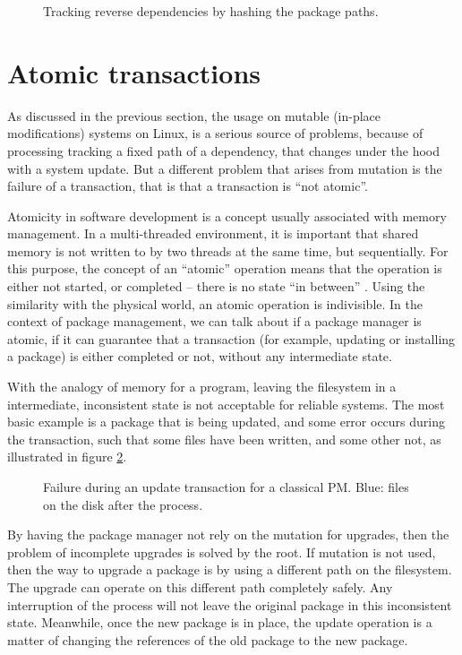 \begin{figure}[hbtp]
    \centerfloat
    
    \caption{Tracking reverse dependencies by hashing the package paths.}
    \label{fig:nginx_miq}
\end{figure}

\FloatBarrier
\section{Atomic transactions}
\label{sec:atomicity}

As discussed in the previous section, the usage on mutable
(in-place modifications) systems on Linux, is a serious
source of problems, because of processing tracking a fixed
path of a dependency, that changes under the hood with a
system update. But a different problem that arises from
mutation is the failure of a transaction, that is that a
transaction is ``not atomic''.

Atomicity in software development is a concept usually
associated with memory management. In a multi-threaded
environment, it is important that shared memory is not
written to by two threads at the same time, but
sequentially. For this purpose, the concept of an ``atomic''
operation means that the operation is either not started, or
completed -- there is no state ``in between''
\cite{neelakantamHardwareAtomicityReliable2007} . Using the
similarity with the physical world, an atomic operation is
indivisible.
In the context of package management, we can talk about if a
package manager is atomic, if it can guarantee that a
transaction (for example, updating or installing a package)
is either completed or not, without any intermediate state.

With the analogy of memory for a program, leaving the
filesystem in a intermediate, inconsistent state is not
acceptable for reliable systems. The most basic example is a
package that is being updated, and some error occurs during
the transaction, such that some files have been written, and
some other not, as illustrated in figure
\ref{fig:atomicity}.


\begin{figure}[hbt]
    \centerfloat
    
    \caption{Failure during an update transaction for a
    classical \ac{PM}. Blue: files on the disk after the process.}
    \label{fig:atomicity}
\end{figure}

By having the package manager not rely on the mutation for
upgrades, then the problem of incomplete upgrades is solved
by the root. If mutation is not used, then the way to
upgrade a package is by using a different path on the
filesystem. The upgrade can operate on this different path
completely safely. Any interruption of the process will not
leave the original package in this inconsistent state.
Meanwhile, once the new package is in place, the update
operation is a matter of changing the references of the old
package to the new package.

